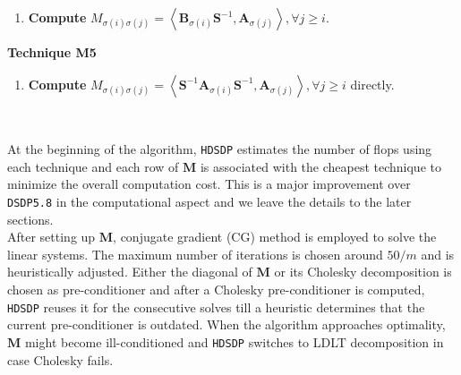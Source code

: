 \documentclass[10pt]{article}
\begin{document}
{\begin{center}
{\begin{minipage}{0.8\textwidth}
\begin{enumerate}
  \item {\textbf{Compute}} $M_{\sigma (i) \sigma (j)} = \left\langle
  \mathbf{B}_{\sigma (i)} \mathbf{S}^{- 1}, \mathbf{A}_{\sigma (j)} \right\rangle, \forall j
  \geq i$.
\end{enumerate}
{\textbf{Technique M5}}
\begin{enumerate}
  \item {\textbf{Compute}} $M_{\sigma (i) \sigma (j)} = \left\langle \mathbf{S}^{-
  1} \mathbf{A}_{\sigma (i)} \mathbf{S}^{- 1}, \mathbf{A}_{\sigma (j)} \right\rangle, \forall j \geq
  i$ directly.\
\end{enumerate}
\end{minipage}}
\end{center}\


At the beginning of the algorithm, {{\texttt{HDSDP}}} estimates the
number of flops using each technique and each row of $\mathbf{M}$ is associated with the cheapest
technique to minimize the overall computation cost. This is a major
improvement over {{\texttt{DSDP5.8}}} in the computational aspect and 
we leave the details to the later sections. \\

After setting up $\mathbf{M}$, conjugate gradient (CG) method is
employed to solve the linear systems. The maximum number of iterations is
chosen around $50 / m$ and is heuristically adjusted. Either the diagonal of
$\mathbf{M}$ or its Cholesky decomposition is chosen as pre-conditioner and
after a Cholesky pre-conditioner is computed, {{\texttt{HDSDP}}} reuses it for 
the consecutive solves till a heuristic determines that the current
pre-conditioner is outdated. When the algorithm approaches optimality, $\mathbf{M}$
might become ill-conditioned and {{\texttt{HDSDP}}} switches to {\textsf{LDLT}} decomposition in case Cholesky fails.\\

}
\end{document}
